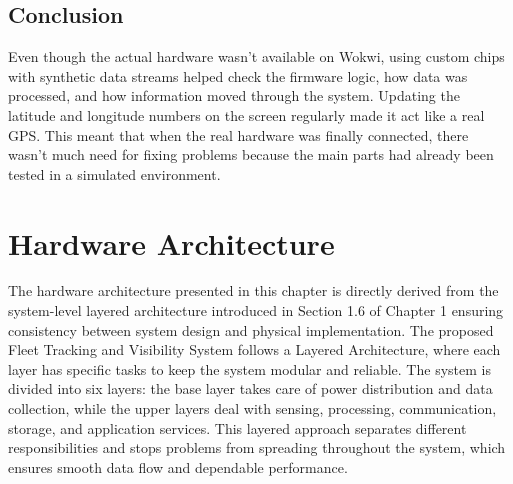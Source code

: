 \begin{table}[H]
    \centering
    \caption{Comparison: Simulation vs Real Hardware}
    \label{tab:3.8}
\end{table}


\subsection{Conclusion}
Even though the actual hardware wasn't available on Wokwi, using custom chips with synthetic data streams helped check the firmware logic, how data was processed, and how information moved through the system. Updating the latitude and longitude numbers on the screen regularly made it act like a real GPS. This meant that when the real hardware was finally connected, there wasn't much need for fixing problems because the main parts had already been tested in a simulated environment.

\section{Hardware Architecture}
The hardware architecture presented in this chapter is directly derived from the system-level layered architecture introduced in Section 1.6 of Chapter 1 ensuring consistency between system design and physical implementation. The proposed Fleet Tracking and Visibility System follows a Layered Architecture, where each layer has specific tasks to keep the system modular and reliable. The system is divided into six layers: the base layer takes care of power distribution and data collection, while the upper layers deal with sensing, processing, communication, storage, and application services. This layered approach separates different responsibilities and stops problems from spreading throughout the system, which ensures smooth data flow and dependable performance.


